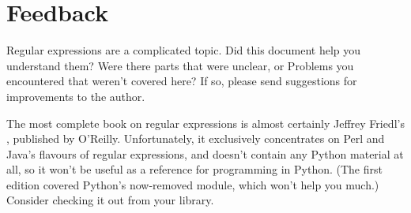 \documentclass{howto}
\begin{document}
\section{Feedback}

Regular expressions are a complicated topic.  Did this document help
you understand them?  Were there parts that were unclear, or Problems
you encountered that weren't covered here?  If so, please send
suggestions for improvements to the author.

The most complete book on regular expressions is almost certainly
Jeffrey Friedl's , published
by O'Reilly.  Unfortunately, it exclusively concentrates on Perl and
Java's flavours of regular expressions, and doesn't contain any Python
material at all, so it won't be useful as a reference for programming
in Python.  (The first edition covered Python's now-removed
 module, which won't help you much.)  Consider checking
it out from your library.
\end{document}
